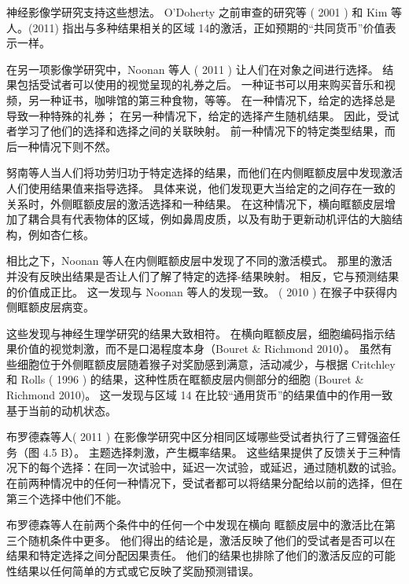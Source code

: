 神经影像学研究支持这些想法。
O'Doherty 之前审查的研究等 ( 2001 ) 和 Kim 等人。(2011) 指出与多种结果相关的区域 14的激活，正如预期的“共同货币”价值表示一样。\par


在另一项影像学研究中，Noonan 等人 ( 2011 ) 让人们在对象之间进行选择。
结果包括受试者可以使用的视觉呈现的礼券之后。
一种证书可以用来购买音乐和视频，另一种证书，咖啡馆的第三种食物，等等。
在一种情况下，给定的选择总是导致一种特殊的礼券； 在另一种情况下，给定的选择产生随机结果。
因此，受试者学习了他们的选择和选择之间的关联映射。
前一种情况下的特定类型结果，而后一种情况下则不然。\par


努南等人当人们将功劳归功于特定选择的结果，而他们在内侧眶额皮层中发现激活人们使用结果值来指导选择。
具体来说，他们发现更大当给定的之间存在一致的关系时，外侧眶额皮层的激活选择和一种结果。
在这种情况下，横向眶额皮层增加了耦合具有代表物体的区域，例如鼻周皮质，以及有助于更新动机评估的大脑结构，例如杏仁核。\par


相比之下，Noonan 等人在内侧眶额皮层中发现了不同的激活模式。
那里的激活并没有反映出结果是否让人们了解了特定的选择-结果映射。
相反，它与预测结果的价值成正比。
这一发现与 Noonan 等人的发现一致。 ( 2010 ) 在猴子中获得内侧眶额皮层病变。\par


这些发现与神经生理学研究的结果大致相符。
在横向眶额皮层，细胞编码指示结果价值的视觉刺激，而不是口渴程度本身（Bouret \& Richmond 2010）。
虽然有些细胞位于外侧眶额皮层随着猴子对奖励感到满意，活动减少，与根据 Critchley 和 Rolls ( 1996 ) 的结果，这种性质在眶额皮层内侧部分的细胞 (Bouret \& Richmond 2010)。
这一发现与区域 14 在比较“通用货币”的结果值中的作用一致基于当前的动机状态。\par


布罗德森等人( 2011 ) 在影像学研究中区分相同区域哪些受试者执行了三臂强盗任务（图 4.5 B）。
主题选择刺激，产生概率结果。
这些结果提供了反馈关于三种情况下的每个选择：在同一次试验中，延迟一次试验，或延迟，通过随机数的试验。
在前两种情况中的任何一种情况下，受试者都可以将结果分配给以前的选择，但在第三个选择中他们不能。\par


布罗德森等人在前两个条件中的任何一个中发现在横向 眶额皮层中的激活比在第三个随机条件中更多。
他们得出的结论是，激活反映了他们的受试者是否可以在结果和特定选择之间分配因果责任。
他们的结果也排除了他们的激活反应的可能性结果以任何简单的方式或它反映了奖励预测错误。\par


